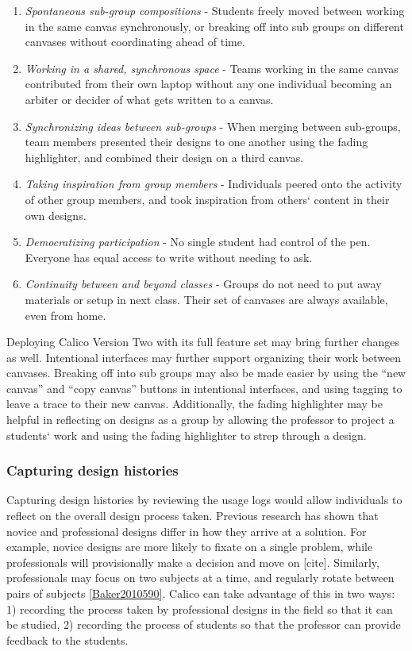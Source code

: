 \begin{enumerate}
	\item \textit{Spontaneous sub-group compositions} - Students freely moved between working in the same canvas synchronously, or breaking off into sub groups on different canvases without coordinating ahead of time.
	\item \textit{Working in a shared, synchronous space} - Teams working in the same canvas contributed from their own laptop without any one individual becoming an arbiter or decider of what gets written to a canvas.
	\item \textit{Synchronizing ideas between sub-groups} - When merging between sub-groups, team members presented their designs to one another using the fading highlighter, and combined their design on a third canvas.
	\item \textit{Taking inspiration from group members} - Individuals peered onto the activity of other group members, and took inspiration from others` content in their own designs.
	\item \textit{Democratizing participation} - No single student had control of the pen. Everyone has equal access to write without needing to ask.
	\item \textit{Continuity between and beyond classes} - Groups do not need to put away materials or setup in next class. Their set of canvases are always available, even from home.
\end{enumerate}

Deploying Calico Version Two with its full feature set may bring further changes as well. Intentional interfaces may further support organizing their work between canvases. Breaking off into sub groups may also be made easier by using the ``new canvas'' and ``copy canvas'' buttons in intentional interfaces, and using tagging to leave a trace to their new canvas. Additionally, the fading highlighter may be helpful in reflecting on designs as a group by allowing the professor to project a students` work and using the fading highlighter to strep through a design.

\subsubsection{Capturing design histories}

Capturing design histories by reviewing the usage logs would allow individuals to reflect on the overall design process taken. Previous research has shown that novice and professional designs differ in how they arrive at a solution. For example, novice designs are more likely to fixate on a single problem, while professionals will provisionally make a decision and move on [cite]. Similarly, professionals may focus on two subjects at a time, and regularly rotate between pairs of subjects \ref{Baker2010590}. 
Calico can take advantage of this in two ways: 1) recording the process taken by professional designs in the field so that it can be studied, 2) recording the process of students so that the professor can provide feedback to the students.

